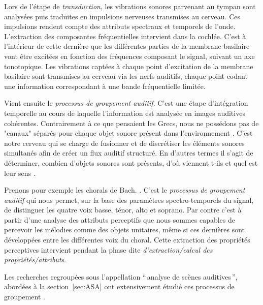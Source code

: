 Lors de l'étape de \emph{transduction}, les vibrations sonores parvenant au tympan sont analysées puis traduites en impulsions nerveuses transmises au cerveau. Ces impulsions rendent compte des attributs spectraux et temporels de l'onde. L'extraction des composantes fréquentielles intervient dans la cochlée. C'est à l'intérieur de cette dernière que les différentes parties de la membrane basilaire vont être excitées en fonction des fréquences composant le signal, suivant un axe tonotopique. Les vibrations captées à chaque point d’excitation de la membrane basilaire sont transmises au cerveau via les nerfs auditifs, chaque point codant une information correspondant à une bande fréquentielle limitée. 

Vient ensuite le \emph{processus de groupement auditif}. C'est une étape d'intégration temporelle au cours de laquelle l'information est analysée en images auditives cohérentes. Contrairement à ce que pensaient les Grecs, nous ne possédons pas de "canaux" séparés pour chaque objet sonore présent dans l'environnement \citep{yost1994fundamentals}. C'est notre cerveau qui se charge de fusionner et de discrétiser les éléments sonores simultanés afin de créer un flux auditif structuré. En d'autres termes il s'agit de déterminer, combien d'objets sonores sont présents, d'où viennent t-ils et quel est leur sens . 


Prenons pour exemple les chorals de Bach. . C'est le \emph{processus de groupement auditif} qui nous permet, sur la base des paramètres spectro-temporels du signal, de distinguer les quatre voix basse, ténor, alto et soprano. Par contre c'est à partir d'une analyse des attributs perceptifs que nous sommes capables de percevoir les mélodies comme des objets unitaires, même si ces dernières sont développées entre les différentes voix du choral. Cette extraction des propriétés perceptives intervient pendant la phase dite \emph{d'extraction/calcul des propriétés/attributs}.

Les recherches regroupées sous l'appellation ``\,analyse de scènes auditives\,'', abordées à la section~\ref{sec:ASA} ont  extensivement étudié ces processus de groupement .

